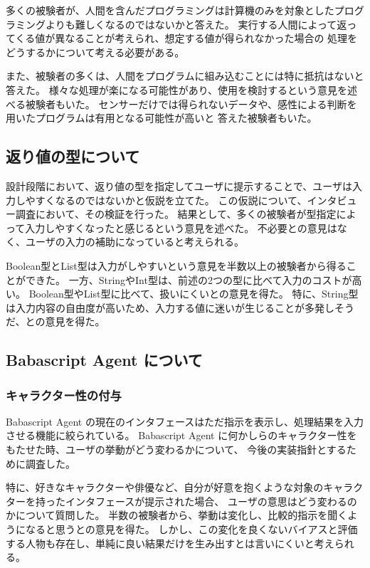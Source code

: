 多くの被験者が、人間を含んだプログラミングは計算機のみを対象としたプログラミングよりも難しくなるのではないかと答えた。
実行する人間によって返ってくる値が異なることが考えられ、想定する値が得られなかった場合の
処理をどうするかについて考える必要がある。

また、被験者の多くは、人間をプログラムに組み込むことには特に抵抗はないと答えた。
様々な処理が楽になる可能性があり、使用を検討するという意見を述べる被験者もいた。
センサーだけでは得られないデータや、感性による判断を用いたプログラムは有用となる可能性が高いと
答えた被験者もいた。

\subsection{返り値の型について}\label{ux8fd4ux308aux5024ux306eux578bux306bux3064ux3044ux3066}

設計段階において、返り値の型を指定してユーザに提示することで、ユーザは入力しやすくなるのではないかと仮説を立てた。
この仮説について、インタビュー調査において、その検証を行った。
結果として、多くの被験者が型指定によって入力しやすくなったと感じるという意見を述べた。
不必要との意見はなく、ユーザの入力の補助になっていると考えられる。

Boolean型とList型は入力がしやすいという意見を半数以上の被験者から得ることができた。
一方、StringやInt型は、前述の2つの型に比べて入力のコストが高い。
Boolean型やList型に比べて、扱いにくいとの意見を得た。
特に、String型は入力内容の自由度が高いため、入力する値に迷いが生じることが多発しそうだ、との意見を得た。

\subsection{Babascript Agent
について}\label{babascript-agent-ux306bux3064ux3044ux3066}

\subsubsection{キャラクター性の付与}\label{ux30adux30e3ux30e9ux30afux30bfux30fcux6027ux306eux4ed8ux4e0e}

Babascript Agent
の現在のインタフェースはただ指示を表示し、処理結果を入力させる機能に絞られている。
Babascript Agent
に何かしらのキャラクター性をもたせた時、ユーザの挙動がどう変わるかについて、
今後の実装指針とするために調査した。

特に、好きなキャラクターや俳優など、自分が好意を抱くような対象のキャラクターを持ったインタフェースが提示された場合、
ユーザの意思はどう変わるのかについて質問した。
半数の被験者から、挙動は変化し、比較的指示を聞くようになると思うとの意見を得た。
しかし、この変化を良くないバイアスと評価する人物も存在し、単純に良い結果だけを生み出すとは言いにくいと考えられる。

